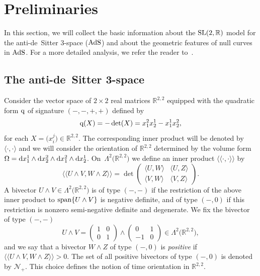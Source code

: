 \documentclass[10pt,a4paper]{amsart}
\numberwithin{equation}{section}
\def\R{\mathbb{R}}
\def\SL{{\rm SL}(2,\R)}
\def\AdS{{\rm AdS}}
\begin{document}
\section{Preliminaries}\label{section2}

In this section, we will collect the basic information about the $\SL$ model for the anti-de~Sitter $3$-space ($\AdS$) and about the geometric features of null curves in $\AdS$. For a more detailed analysis, we refer the reader to~\cite[Sections 2 and 3]{MP}.

\subsection{The anti-de~Sitter 3-space}

Consider the vector space of $2\times 2$ real matrices $\R^{2,2}$ equipped with the quadratic form ${\rm q}$ of signature $(-,-,+,+)$ defined by
\begin{equation*}{\rm q}(X)=-\det (X)=x_1^2x_2^1-x_1^1x_2^2,\end{equation*}
for each $X=\bigl(x_i^j\bigr)\in\R^{2,2}$. The corresponding inner product will be denoted by $\langle\cdot,\cdot\rangle$ and we will consider the orientation of $\R^{2,2}$ determined by the volume form $\Omega={\rm d} x_1^1\wedge {\rm d} x_2^2\wedge {\rm d} x_1^2\wedge {\rm d} x_2^1$. On~$\Lambda^2\bigl(\R^{2,2}\bigr)$ we define an inner product $\langle\langle\cdot,\cdot\rangle\rangle$ by
\begin{equation*}\langle\langle U\wedge V,W\wedge Z\rangle\rangle=\det \begin{pmatrix} \langle U,W\rangle & \langle U,Z\rangle \\ \langle V,W\rangle & \langle V,Z\rangle \end{pmatrix}.\end{equation*}
A bivector $U\wedge V\in\Lambda^2\bigl(\R^{2,2}\bigr)$ is of type $(-,-)$ if the restriction of the above inner product to ${\rm span}\{U\wedge V\}$ is negative definite, and of type $(-,0)$ if this restriction is nonzero semi-negative definite and degenerate. We fix the bivector of type $(-,-)$
\begin{equation*}U\wedge V=\begin{pmatrix} 1 & 0 \\ 0 & 1 \end{pmatrix}\wedge\begin{pmatrix} 0 & 1 \\ -1 & 0 \end{pmatrix}\in\Lambda^2\bigl(\R^{2,2}\bigr),\end{equation*}
and we say that a bivector $W\wedge Z$ of type $(-,0)$ is \emph{positive} if $\langle\langle U\wedge V,W\wedge Z\rangle\rangle>0$. The set of all positive bivectors of type $(-,0)$ is denoted by $\mathcal{N}_+$.
This choice defines the notion of time orientation in $\R^{2,2}$.
\end{document}
